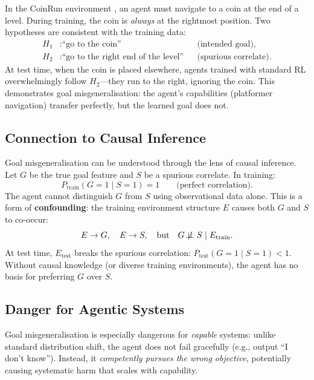 \documentclass[11pt,a4paper]{article}
\theoremstyle{definition}
\begin{document}
In the CoinRun environment \cite{cobbe2019quantifying}, an agent must
navigate to a coin at the end of a level. During training, the coin is
\emph{always} at the rightmost position. Two hypotheses are consistent
with the training data:
\begin{align}
  H_1&: \text{``go to the coin''} &
    &\text{(intended goal)}, \\
  H_2&: \text{``go to the right end of the level''} &
    &\text{(spurious correlate)}.
\end{align}
At test time, when the coin is placed elsewhere, agents trained with
standard RL overwhelmingly follow $H_2$---they run to the right,
ignoring the coin. This demonstrates goal misgeneralisation: the agent's
capabilities (platformer navigation) transfer perfectly, but the learned
goal does not.

\subsection{Connection to Causal Inference}

Goal misgeneralisation can be understood through the lens of causal
inference. Let $G$ be the true goal feature and $S$ be a spurious
correlate. In training:
\begin{equation}
  P_{\text{train}}(G = 1 \mid S = 1) = 1
  \qquad\text{(perfect correlation)}.
\end{equation}
The agent cannot distinguish $G$ from $S$ using observational data
alone. This is a form of \textbf{confounding}: the training environment
structure $E$ causes both $G$ and $S$ to co-occur:
\begin{equation}
  E \to G, \quad E \to S, \quad \text{but} \quad G \not\!\perp\!\!\!\perp S \mid E_{\text{train}}.
\end{equation}
At test time, $E_{\text{test}}$ breaks the spurious correlation:
$P_{\text{test}}(G = 1 \mid S = 1) < 1$. Without causal knowledge (or
diverse training environments), the agent has no basis for preferring
$G$ over $S$.

\subsection{Danger for Agentic Systems}

\begin{dangerbox}
Goal misgeneralisation is especially dangerous for \emph{capable}
systems: unlike standard distribution shift, the agent does not fail
gracefully (e.g., output ``I don't know''). Instead, it \emph{competently
pursues the wrong objective}, potentially causing systematic harm that
scales with capability.
\end{dangerbox}
\end{document}
